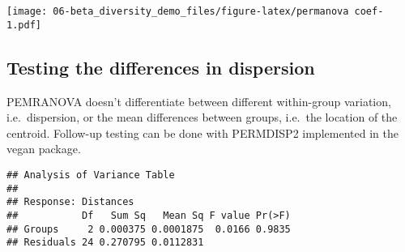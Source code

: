 \documentclass[
  oneside]{book}
\newenvironment{Shaded}{\begin{snugshade}}{\end{snugshade}}
\newcommand{\AttributeTok}[1]{\textcolor[rgb]{0.77,0.63,0.00}{#1}}
\newcommand{\CommentTok}[1]{\textcolor[rgb]{0.56,0.35,0.01}{\textit{#1}}}
\newcommand{\FunctionTok}[1]{\textcolor[rgb]{0.00,0.00,0.00}{#1}}
\newcommand{\NormalTok}[1]{#1}
\newcommand{\OtherTok}[1]{\textcolor[rgb]{0.56,0.35,0.01}{#1}}
\newcommand{\SpecialCharTok}[1]{\textcolor[rgb]{0.00,0.00,0.00}{#1}}
\newcommand{\StringTok}[1]{\textcolor[rgb]{0.31,0.60,0.02}{#1}}
\begin{document}
\texttt{[image: 06-beta\_diversity\_demo\_files/figure-latex/permanova coef-1.pdf]}

\hypertarget{testing-the-differences-in-dispersion}{%
\subsection{Testing the differences in dispersion}\label{testing-the-differences-in-dispersion}}

PEMRANOVA doesn't differentiate between different within-group variation, i.e.~dispersion, or the mean differences between groups, i.e.~the location of the centroid.
Follow-up testing can be done with PERMDISP2 implemented in the vegan package.

\begin{Shaded}
\end{Shaded}

\begin{verbatim}
## Analysis of Variance Table
## 
## Response: Distances
##           Df   Sum Sq   Mean Sq F value Pr(>F)
## Groups     2 0.000375 0.0001875  0.0166 0.9835
## Residuals 24 0.270795 0.0112831
\end{verbatim}

\begin{Shaded}
\end{Shaded}
\end{document}
